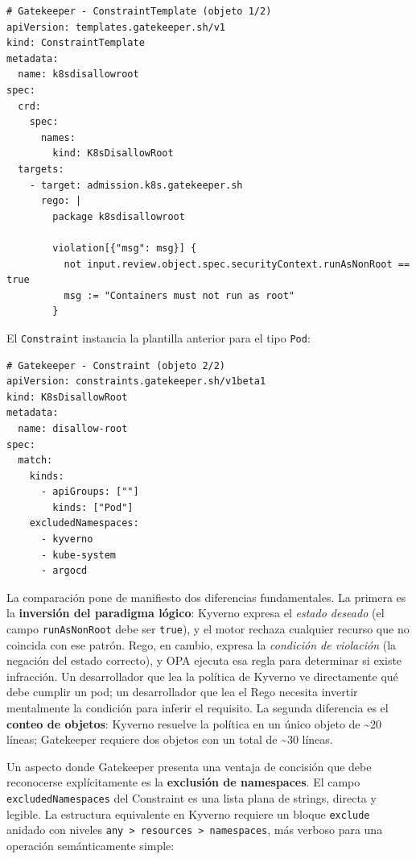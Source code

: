 \begin{lstlisting}
# Gatekeeper - ConstraintTemplate (objeto 1/2)
apiVersion: templates.gatekeeper.sh/v1
kind: ConstraintTemplate
metadata:
  name: k8sdisallowroot
spec:
  crd:
    spec:
      names:
        kind: K8sDisallowRoot
  targets:
    - target: admission.k8s.gatekeeper.sh
      rego: |
        package k8sdisallowroot

        violation[{"msg": msg}] {
          not input.review.object.spec.securityContext.runAsNonRoot == true
          msg := "Containers must not run as root"
        }
\end{lstlisting}

El \texttt{Constraint} instancia la plantilla anterior para el tipo \texttt{Pod}:

\begin{lstlisting}
# Gatekeeper - Constraint (objeto 2/2)
apiVersion: constraints.gatekeeper.sh/v1beta1
kind: K8sDisallowRoot
metadata:
  name: disallow-root
spec:
  match:
    kinds:
      - apiGroups: [""]
        kinds: ["Pod"]
    excludedNamespaces:
      - kyverno
      - kube-system
      - argocd
\end{lstlisting}

La comparación pone de manifiesto dos diferencias fundamentales. La primera es la \textbf{inversión del paradigma lógico}: Kyverno expresa el \textit{estado deseado} (el campo \texttt{runAsNonRoot} debe ser \texttt{true}), y el motor rechaza cualquier recurso que no coincida con ese patrón. Rego, en cambio, expresa la \textit{condición de violación} (la negación del estado correcto), y OPA ejecuta esa regla para determinar si existe infracción. Un desarrollador que lea la política de Kyverno ve directamente qué debe cumplir un pod; un desarrollador que lea el Rego necesita invertir mentalmente la condición para inferir el requisito. La segunda diferencia es el \textbf{conteo de objetos}: Kyverno resuelve la política en un único objeto de \textasciitilde20 líneas; Gatekeeper requiere dos objetos con un total de \textasciitilde30 líneas.

Un aspecto donde Gatekeeper presenta una ventaja de concisión que debe reconocerse explícitamente es la \textbf{exclusión de namespaces}. El campo \texttt{excludedNamespaces} del Constraint es una lista plana de strings, directa y legible. La estructura equivalente en Kyverno requiere un bloque \texttt{exclude} anidado con niveles \texttt{any > resources > namespaces}, más verboso para una operación semánticamente simple:

